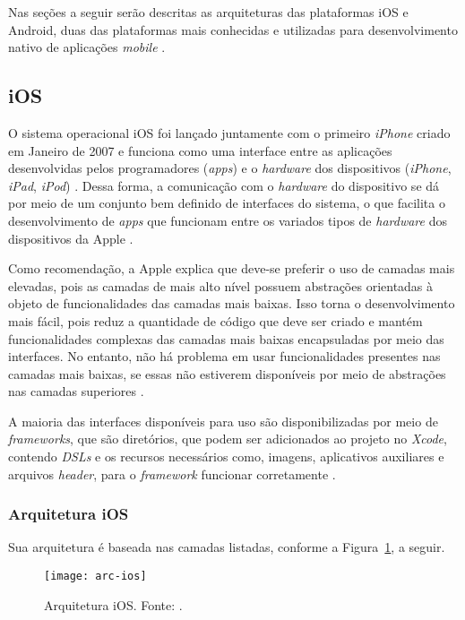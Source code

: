 Nas seções a seguir serão descritas as arquiteturas das plataformas iOS e Android, duas das plataformas mais conhecidas e utilizadas para desenvolvimento nativo de aplicações \textit{mobile} \cite{jobe_native_2013}.

\subsection{iOS} \label{subsection:ios}

O sistema operacional iOS foi lançado juntamente com o primeiro \textit{iPhone} criado em Janeiro de 2007 e 
funciona como uma interface entre as aplicações desenvolvidas pelos programadores (\textit{apps}) e o \textit{hardware} 
dos dispositivos (\textit{iPhone}, \textit{iPad}, \textit{iPod}) \cite{apple_inc_apple_2007}. 
Dessa forma, a comunicação com o \textit{hardware} do dispositivo se dá 
por meio de um conjunto bem definido de interfaces do sistema, o que facilita o desenvolvimento de \textit{apps} 
que funcionam entre os variados tipos de \textit{hardware} dos dispositivos da Apple \cite{apple_inc_developing_2016}. 

Como recomendação, a Apple explica que deve-se preferir o uso de camadas mais elevadas, pois as camadas de 
mais alto nível possuem abstrações orientadas à objeto de funcionalidades das camadas mais baixas. Isso 
torna o desenvolvimento mais fácil, pois reduz a quantidade de código que deve ser criado e mantém funcionalidades 
complexas das camadas mais baixas encapsuladas por meio das interfaces. No entanto, não há problema em usar 
funcionalidades presentes nas camadas mais baixas, se essas não estiverem disponíveis por meio de abstrações nas 
camadas superiores \cite{apple_inc_tech_2014}. 

A maioria das interfaces disponíveis para uso são disponibilizadas por meio de \textit{frameworks}, 
que são diretórios, que podem ser adicionados ao projeto no \textit{Xcode}, contendo \textit{DSLs} e os recursos necessários como, 
imagens, aplicativos auxiliares e arquivos \textit{header}, para o \textit{framework} funcionar corretamente \cite{apple_inc_tech_2014}.

\subsubsection{Arquitetura iOS} \label{subsubsection:arc-ios}
Sua arquitetura é baseada nas camadas listadas, conforme a Figura~\ref{fig:arc-ios}, a seguir.
 
\begin{figure}[H]
  \centering
    \texttt{[image: arc-ios]}
    \caption[Arquitetura iOS]{ Arquitetura iOS. Fonte: \cite{apple_inc_tech_2014}.}
	\label{fig:arc-ios}
\end{figure}

